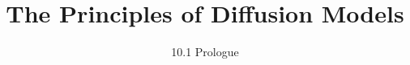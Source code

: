 ﻿%

\title{The Principles of Diffusion Models}
\subtitle{10.1 Prologue}


\begin{frame}
    \titlepage
\end{frame}


